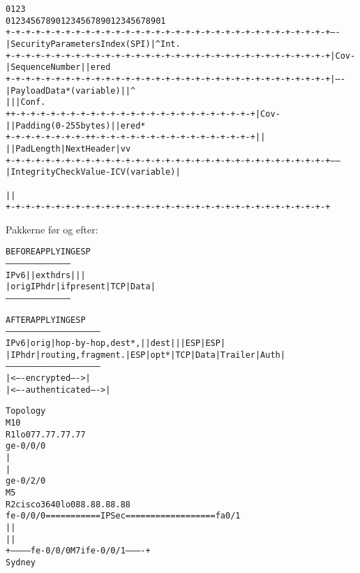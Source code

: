 \documentclass[Screen16to9,17pt]{foils}
\begin{document}
\begin{alltt}\small
0                   1                   2                   3
0 1 2 3 4 5 6 7 8 9 0 1 2 3 4 5 6 7 8 9 0 1 2 3 4 5 6 7 8 9 0 1
+-+-+-+-+-+-+-+-+-+-+-+-+-+-+-+-+-+-+-+-+-+-+-+-+-+-+-+-+-+-+-+-+ ----
|               Security Parameters Index (SPI)                 | ^Int.
+-+-+-+-+-+-+-+-+-+-+-+-+-+-+-+-+-+-+-+-+-+-+-+-+-+-+-+-+-+-+-+-+ |Cov-
|                      Sequence Number                          | |ered
+-+-+-+-+-+-+-+-+-+-+-+-+-+-+-+-+-+-+-+-+-+-+-+-+-+-+-+-+-+-+-+-+ | ----
|                    Payload Data* (variable)                   | |   ^
|                                                               | |Conf.
+               +-+-+-+-+-+-+-+-+-+-+-+-+-+-+-+-+-+-+-+-+-+-+-+-+ |Cov-
|               |     Padding (0-255 bytes)                     | |ered*
+-+-+-+-+-+-+-+-+               +-+-+-+-+-+-+-+-+-+-+-+-+-+-+-+-+ |   |
|                               |  Pad Length   | Next Header   | v   v
+-+-+-+-+-+-+-+-+-+-+-+-+-+-+-+-+-+-+-+-+-+-+-+-+-+-+-+-+-+-+-+-+ ------
|         Integrity Check Value-ICV   (variable)                |
~                                                               ~
|                                                               |
+-+-+-+-+-+-+-+-+-+-+-+-+-+-+-+-+-+-+-+-+-+-+-+-+-+-+-+-+-+-+-+-+
\end{alltt}

Pakkerne før og efter:
\begin{alltt}\small
               BEFORE APPLYING ESP
         ---------------------------------------
   IPv6  |             | ext hdrs |     |      |
         | orig IP hdr |if present| TCP | Data |
         ---------------------------------------



               AFTER APPLYING ESP
         ---------------------------------------------------------
   IPv6  | orig |hop-by-hop,dest*,|   |dest|   |    | ESP   | ESP|
         |IP hdr|routing,fragment.|ESP|opt*|TCP|Data|Trailer|Auth|
         ---------------------------------------------------------
                                   |<---- encrypted ---->|
                               |<---- authenticated ---->|
\end{alltt}





\begin{alltt}\small
Topology
  M10
  R1      lo0 77.77.77.77
ge-0/0/0
   |
   |
ge-0/2/0
  M5
  R2                                         cisco3640  lo0 88.88.88.88
fe-0/0/0  ===========IPSec==================    fa0/1
   |                                              |
   |                                              |
   +----------- fe-0/0/0  M7i  fe-0/0/1 ----------+
                        Sydney
\end{alltt}
\end{document}
